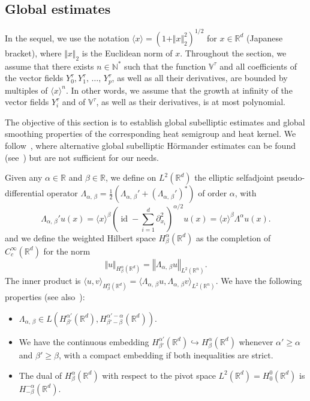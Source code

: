 \documentclass[AHL,Unicode,published]{cedram}
\newcommand*\R{\mathbb{R}}
\newcommand*\N{\mathbb{N}}
\newcommand{\bbV}{\mathbb{V}}
\DeclareMathOperator{\id}{id}
\renewcommand{\geq}{\geqslant}
\begin{document}
\subsection{Global estimates}\label{sec:global_estimates}
In the sequel, we use the notation $\langle x\rangle = (1+\Vert x\Vert_2^2)^{1/2}$ for $x\in\R^d$ (Japanese bracket), where $\Vert x\Vert_2$ is the Euclidean norm of $x$. Throughout the section, we assume that there exists $n\in\N^*$ such that the function $\bbV^\tau$ and all coefficients of the vector fields $Y_0^\tau,Y_1^\tau,\,\ldots,\,Y_p^\tau$, as well as all their derivatives, are bounded by multiples of $\langle x\rangle^n$. In other words, we assume that the growth at infinity of the vector fields $Y_i^\tau$ and of $\bbV^\tau$, as well as their derivatives, is at most polynomial.

The objective of this section is to establish global subelliptic estimates and global smoothing properties of the corresponding heat semigroup and heat kernel. We follow~\cite{EckmannHairer}, where alternative global subelliptic H\"ormander estimates can be found (see~\cite[Theorems~3.1 and 4.1]{EckmannHairer}) but are not sufficient for our needs.

Given any $\alpha\in\R$ and $\beta\in\R$, we define on $L^2(\R^d)$ the elliptic selfadjoint pseudo-differential operator $\Lambda_{\alpha,\,\beta}=\frac{1}{2}(\Lambda_{\alpha,\,\beta}'+(\Lambda_{\alpha,\,\beta}')^*)$ of order $\alpha$, with
\begin{equation*}
\Lambda_{\alpha,\,\beta}' u(x) = \langle x\rangle^\beta \left(\id-\sum_{i=1}^d\partial_{x_i}^2 \right)^{\alpha/2} u(x) = \langle x\rangle^\beta \Lambda^\alpha u(x).
\end{equation*}
and we define the weighted Hilbert space $H^\alpha_\beta(\R^d)$ as the completion of $C_c^\infty(\R^d)$ for the norm
\[
\Vert u\Vert_{H^\alpha_\beta\left(\R^d\right)} = \left\Vert \Lambda_{\alpha,\,\beta} u\right\Vert_{L^2\left(\R^n\right)}.
\]
The inner product is $\langle u,v\rangle_{H^\alpha_\beta(\R^d)} = \langle \Lambda_{\alpha,\,\beta}u,\Lambda_{\alpha,\,\beta}v\rangle_{L^2(\R^n)} $. We have the following properties (see also~\cite{EckmannHairer}):
\begin{itemize}
\item $\Lambda_{\alpha,\,\beta} \in L(H^{\alpha'}_{\beta'}(\R^d), H^{\alpha'-\alpha}_{\beta'-\beta}(\R^d))$.
\item We have the continuous embedding $H^{\alpha'}_{\beta'}(\R^d) \hookrightarrow H^{\alpha}_{\beta}(\R^d)$ whenever $\alpha'\geq\alpha$ and $\beta'\geq\beta$, with a compact embedding if both inequalities are strict.
\item The dual of $H^{\alpha}_{\beta}(\R^d)$ with respect to the pivot space $L^2(\R^d)=H^0_0(\R^d)$ is $H^{-\alpha}_{-\beta}(\R^d)$.
\end{itemize}
\end{document}
